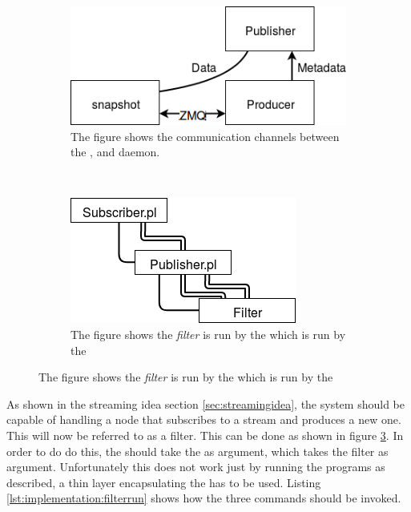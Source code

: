\begin{figure}[H]
    \centering
    \begin{subfigure}[b]{0.45\textwidth}
        \includegraphics[width=\textwidth]{figures/impl_example_snapshot_overview}
        \caption{The figure shows the communication channels between the \pub{}, \pro{} and  daemon.}
        \label{fig:implementation:dynamicmetadata}
    \end{subfigure}
    ~ %
    \begin{subfigure}[b]{0.45\textwidth}
        \includegraphics[width=\textwidth]{figures/impl_example_filter_overview}
        \caption{The figure shows the \textit{filter} is run by the \pub{} which is run by the \sub{}}
        \label{fig:implementation:filer}
    \end{subfigure}
\end{figure}

As shown in the streaming idea section \ref{sec:streamingidea}, the system should be capable of handling a node that subscribes to a stream and produces a new one. This will now be referred to as a filter. This can be done as shown in figure \ref{fig:implementation:filer}. In order to do do this, the \sub{} should take the \pub{} as argument, which takes the filter as argument. Unfortunately this does not work just by running the programs as described, a thin layer encapsulating the \pub{} has to be used. Listing \ref{lst:implementation:filterrun} shows how the three commands should be invoked.


